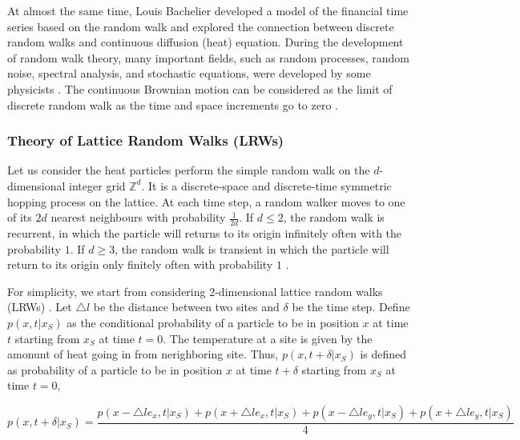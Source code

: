 At almost the same time, Louis Bachelier \cite{bachelier1900theorie}
developed a model of the financial time series based on the random
walk and explored the connection between discrete random walks and
continuous diffusion (heat) equation. During the development of random
walk theory, many important fields, such as random processes, random
noise, spectral analysis, and stochastic equations, were developed by
some physicists \cite{einstein1905electrodynamics}
\cite{einstein1906theory} \cite{smoluchowski1916drei}. The continuous
Brownian motion can be considered as the limit of discrete random walk
as the time and space increments go to zero \cite{lawler2010random}.





\subsubsection{Theory of Lattice Random Walks (LRWs)}

Let us consider the heat particles perform the simple random walk on
the $d$-dimensional integer grid $\mathbb{Z}^d$. It is a
discrete-space and discrete-time symmetric hopping process
\cite{redner2001guide} on the lattice. At each time step, a random
walker moves to one of its $2d$ nearest neighbours with probability
$\frac{1}{2d}$. If $d \leq 2$, the random walk is recurrent, in which
the particle will returns to its origin infinitely often with the
probability $1$. If $d \geq 3$, the random walk is transient in which
the particle will return to its origin only finitely often with
probability $1$ \cite{hughes1998random}.


For simplicity, we start from considering $2$-dimensional lattice
random walks (LRWs) \cite{lawler2010random}. Let $\triangle l$ be the
distance between two sites and $\delta$ be the time step. Define $p(x,
t| x_{S})$ as the conditional probability of a particle to be in
position $x$ at time $t$ starting from $x_{S}$ at time $t=0$. The
temperature at a site is given by the amonunt of heat going in from
nerighboring site. Thus, $p(x, t + \delta |x_{S})$ is defined as
probability of a particle to be in position $x$ at time $t + \delta$
starting from $x_{S}$ at time $t=0$,

\begin{equation}
  p(x, t + \delta | x_{S}) = \frac{p(x - \triangle l e_{x}, t| x_{S}) +
    p(x + \triangle l e_{x}, t| x_{S}) + p(x - \triangle l e_{y}, t|
    x_{S}) + p(x + \triangle l e_{y}, t| x_{S})}{4}
\end{equation}

